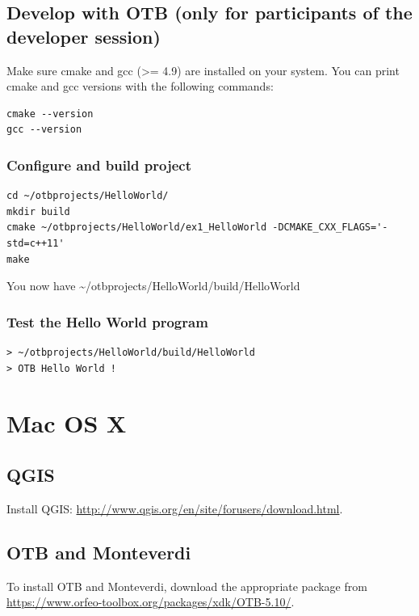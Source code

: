 \documentclass[10pt,a4paper]{article}
\begin{document}
\subsection{Develop with OTB (only for participants of the developer session)}

Make sure cmake and gcc (>= 4.9) are installed on your system. You can print
cmake and gcc versions with the following commands: 

\begin{verbatim}
cmake --version
gcc --version
\end{verbatim}

\subsubsection{Configure and build project}

\begin{verbatim}
cd ~/otbprojects/HelloWorld/
mkdir build
cmake ~/otbprojects/HelloWorld/ex1_HelloWorld -DCMAKE_CXX_FLAGS='-std=c++11'
make
\end{verbatim}

You now have \textasciitilde/otbprojects/HelloWorld/build/HelloWorld

\subsubsection{Test the Hello World program}

\begin{verbatim}
> ~/otbprojects/HelloWorld/build/HelloWorld
> OTB Hello World !
\end{verbatim}

\section{Mac OS X}

\subsection{QGIS}
Install QGIS: \url{http://www.qgis.org/en/site/forusers/download.html}.

\subsection{OTB and Monteverdi}

To install OTB and Monteverdi, download the appropriate package from \url{https://www.orfeo-toolbox.org/packages/xdk/OTB-5.10/}.
\end{document}
